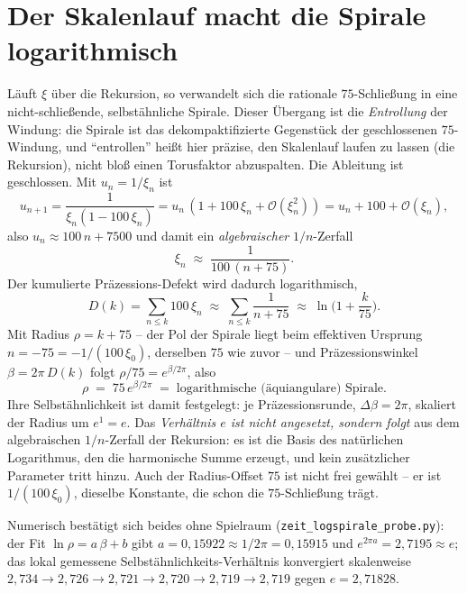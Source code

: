 \section{Der Skalenlauf macht die Spirale logarithmisch}
Läuft $\xi$ über die Rekursion, so verwandelt sich die rationale $75$-Schließung in eine
nicht-schließende, selbstähnliche Spirale. Dieser Übergang ist die \emph{Entrollung} der Windung:
die Spirale ist das dekompaktifizierte Gegenstück der geschlossenen $75$-Windung, und
\enquote{entrollen} heißt hier präzise, den Skalenlauf laufen zu lassen (die Rekursion), nicht
bloß einen Torusfaktor abzuspalten. Die Ableitung ist geschlossen. Mit $u_n=1/\xi_n$
ist
\begin{equation}
  u_{n+1}=\frac{1}{\xi_n(1-100\,\xi_n)}=u_n\,(1+100\,\xi_n+\mathcal{O}(\xi_n^2))
         =u_n+100+\mathcal{O}(\xi_n),
\end{equation}
also $u_n\approx 100\,n+7500$ und damit ein \emph{algebraischer} $1/n$-Zerfall
\begin{equation}
  \xi_n\;\approx\;\frac{1}{100\,(n+75)} .
\end{equation}
Der kumulierte Präzessions-Defekt wird dadurch logarithmisch,
\begin{equation}
  D(k)=\sum_{n\le k}100\,\xi_n\;\approx\;\sum_{n\le k}\frac{1}{n+75}
       \;\approx\;\ln\!\Big(1+\frac{k}{75}\Big).
\end{equation}
Mit Radius $\rho=k+75$ -- der Pol der Spirale liegt beim effektiven Ursprung
$n=-75=-1/(100\,\xi_0)$, derselben $75$ wie zuvor -- und Präzessionswinkel $\beta=2\pi\,D(k)$
folgt $\rho/75=e^{\beta/2\pi}$, also
\begin{equation}
  \rho\;=\;75\,e^{\beta/2\pi}\;=\;\text{logarithmische (äquiangulare) Spirale.}
\end{equation}
Ihre Selbstähnlichkeit ist damit festgelegt: je Präzessionsrunde, $\Delta\beta=2\pi$, skaliert
der Radius um $e^{1}=e$. Das \emph{Verhältnis $e$ ist nicht angesetzt, sondern folgt} aus dem
algebraischen $1/n$-Zerfall der Rekursion: es ist die Basis des natürlichen Logarithmus, den die
harmonische Summe erzeugt, und kein zusätzlicher Parameter tritt hinzu. Auch der Radius-Offset
$75$ ist nicht frei gewählt -- er ist $1/(100\,\xi_0)$, dieselbe Konstante, die schon die
$75$-Schließung trägt.

Numerisch bestätigt sich beides ohne Spielraum (\texttt{zeit\_logspirale\_probe.py}): der Fit
$\ln\rho=a\,\beta+b$ gibt $a=0{,}15922\approx 1/2\pi=0{,}15915$ und $e^{2\pi a}=2{,}7195\approx e$;
das lokal gemessene Selbstähnlichkeits-Verhältnis konvergiert skalenweise
$2{,}734\to2{,}726\to2{,}721\to2{,}720\to2{,}719\to2{,}719$ gegen $e=2{,}71828$.


